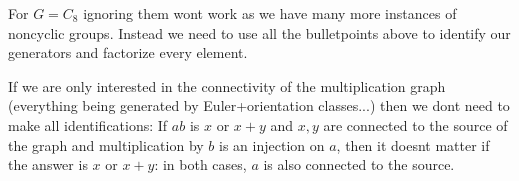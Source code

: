 For $G=C_8$ ignoring them won\textquotesingle{}t work as we have many more instances of noncyclic groups. Instead we need to use all the bulletpoints above to identify our generators and factorize every element.

If we are only interested in the connectivity of the multiplication graph (everything being generated by Euler+orientation classes...) then we don\textquotesingle{}t need to make all identifications\+: If $ab$ is $x$ or $x+y$ and $x,y$ are connected to the source of the graph and multiplication by $b$ is an injection on $a$, then it doesn\textquotesingle{}t matter if the answer is $x$ or $x+y$\+: in both cases, $a$ is also connected to the source. 